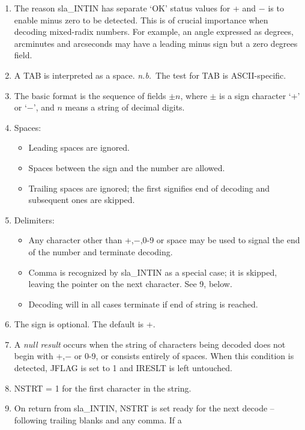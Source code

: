 \documentclass[11pt,twoside]{article}
\begin{document}
{
 \begin{enumerate}
 \item The reason sla\_INTIN has separate `OK' status values
       for + and $-$ is to enable minus zero to be detected.
       This is of crucial importance
       when decoding mixed-radix numbers.  For example, an angle
       expressed as degrees, arcminutes and arcseconds may have a
       leading minus sign but a zero degrees field.
 \item A TAB is interpreted as a space. {\it n.b.}\ The test for TAB is
       ASCII-specific.
 \item The basic format is the sequence of fields $\pm n$,
       where $\pm$ is a sign
       character `+' or `$-$', and $n$ means a string of decimal digits.
 \item Spaces:
       \begin{itemize}
       \item Leading spaces are ignored.
       \item Spaces between the sign and the number are allowed.
       \item Trailing spaces are ignored;  the first signifies
             end of decoding and subsequent ones are skipped.
       \end{itemize}
 \item Delimiters:
       \begin{itemize}
       \item Any character other than +,$-$,0-9 or space may be
             used to signal the end of the number and terminate decoding.
       \item Comma is recognized by sla\_INTIN as a special case; it
             is skipped, leaving the pointer on the next character.  See
             9, below.
       \item Decoding will in all cases terminate if end of string
             is reached.
       \end{itemize}
 \item The sign is optional.  The default is +.
 \item A {\it null result}\/ occurs when the string of characters
       being decoded does not begin with +,$-$ or 0-9, or
       consists entirely of spaces.  When this condition is
       detected, JFLAG is set to 1 and IRESLT is left untouched.
 \item NSTRT = 1 for the first character in the string.
 \item On return from sla\_INTIN, NSTRT is set ready for the next
       decode -- following trailing blanks and any comma.  If a

\end{enumerate}}
\end{document}
